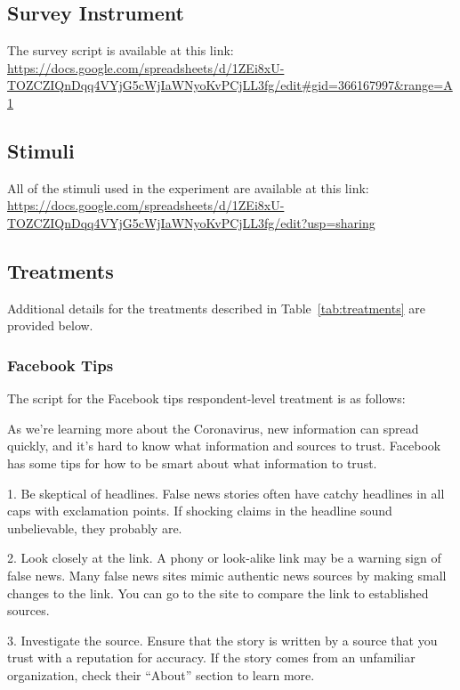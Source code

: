 \documentclass[letterpaper, 12pt, parskip=full,DIV=10]{scrartcl}
\begin{document}
\subsection{Survey Instrument}\label{appendix:survey}%
The survey script is available at this link:\\
\url{https://docs.google.com/spreadsheets/d/1ZEi8xU-TOZCZIQnDqq4VYjG5cWjIaWNyoKvPCjLL3fg/edit#gid=366167997&range=A1}

\subsection{Stimuli}\label{appendix:stimuli}
All of the stimuli used in the experiment are available at this link:\\
\url{https://docs.google.com/spreadsheets/d/1ZEi8xU-TOZCZIQnDqq4VYjG5cWjIaWNyoKvPCjLL3fg/edit?usp=sharing}


\subsection{Treatments}\label{sec:treatments}
Additional details for the treatments described in Table~\ref{tab:treatments} are provided below. 


\subsubsection{Facebook Tips}\label{sec:fbtips}
The script for the Facebook tips respondent-level treatment is as follows:

As we're learning more about the Coronavirus, new information can spread quickly, and it's hard to know what information and sources to trust. Facebook has some tips for how to be smart about what information to trust. 

1. Be skeptical of headlines. False news stories often have catchy headlines in all caps with exclamation points. If shocking claims in the headline sound unbelievable, they probably are.

2. Look closely at the link. A phony or look-alike link may be a warning sign of false news. Many false news sites mimic authentic news sources by making small changes to the link. You can go to the site to compare the link to established sources.

3. Investigate the source. Ensure that the story is written by a source that you trust with a reputation for accuracy. If the story comes from an unfamiliar organization, check their ``About'' section to learn more.
\end{document}
